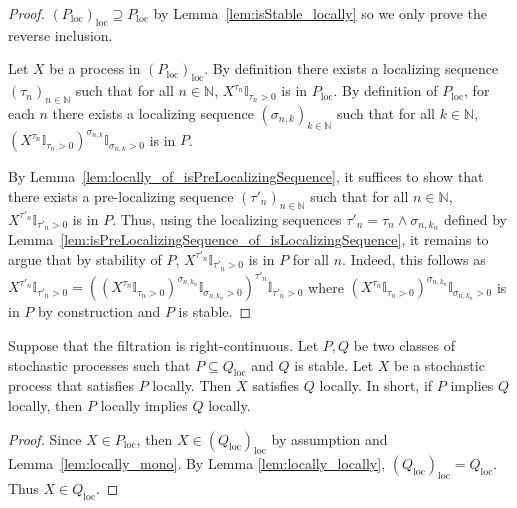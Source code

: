 \begin{proof}  
$(P_{\mathrm{loc}})_{\mathrm{loc}} \supseteq P_{\mathrm{loc}}$ by Lemma~\ref{lem:isStable_locally} so we only prove the reverse inclusion.

Let $X$ be a process in $(P_{\mathrm{loc}})_{\mathrm{loc}}$.
By definition there exists a localizing sequence $(\tau_n)_{n \in \mathbb{N}}$ such that for all $n \in \mathbb{N}$, $X^{\tau_n}\mathbb{I}_{\tau_n > 0}$ is in $P_{\mathrm{loc}}$.
By definition of $P_{\mathrm{loc}}$, for each $n$ there exists a localizing sequence $(\sigma_{n,k})_{k \in \mathbb{N}}$ such that for all $k \in \mathbb{N}$, $(X^{\tau_n}\mathbb{I}_{\tau_n > 0})^{\sigma_{n,k}}\mathbb{I}_{\sigma_{n,k} > 0}$ is in $P$.

By Lemma~\ref{lem:locally_of_isPreLocalizingSequence}, it suffices to show that there exists a pre-localizing sequence $(\tau'_n)_{n \in \mathbb{N}}$ such that for all $n \in \mathbb{N}$, $X^{\tau'_n}\mathbb{I}_{\tau'_n > 0}$ is in $P$.
Thus, using the localizing sequences $\tau'_n = \tau_n \wedge \sigma_{n, k_n}$ defined by Lemma~\ref{lem:isPreLocalizingSequence_of_isLocalizingSequence},
it remains to argue that by stability of $P$, $X^{\tau'_n}\mathbb{I}_{\tau'_n > 0}$ is in $P$ for all $n$.
Indeed, this follows as $X^{\tau'_n}\mathbb{I}_{\tau'_n > 0} = ((X^{\tau_n}\mathbb{I}_{\tau_n > 0})^{\sigma_{n,k_n}}\mathbb{I}_{\sigma_{n,k_n} > 0})^{\tau'_n}\mathbb{I}_{\tau'_n > 0}$ where $(X^{\tau_n}\mathbb{I}_{\tau_n > 0})^{\sigma_{n,k_n}}\mathbb{I}_{\sigma_{n,k_n} > 0}$ is in $P$ by construction and $P$ is stable.
\end{proof}


\begin{lemma}\label{lem:local_induction}
  \mathlibok
Suppose that the filtration is right-continuous.
Let $P, Q$ be two classes of stochastic processes such that $P \subseteq Q_{\mathrm{loc}}$ and $Q$ is stable.
Let $X$ be a stochastic process that satisfies $P$ locally.
Then $X$ satisfies $Q$ locally.
In short, if $P$ implies $Q$ locally, then $P$ locally implies $Q$ locally.
\end{lemma}

\begin{proof}  
Since $X \in P_{\mathrm{loc}}$, then $X \in (Q_{\mathrm{loc}})_{\mathrm{loc}}$ by assumption and Lemma~\ref{lem:locally_mono}.
By Lemma \ref{lem:locally_locally}, $(Q_{\mathrm{loc}})_{\mathrm{loc}} = Q_{\mathrm{loc}}$.
Thus $X \in Q_{\mathrm{loc}}$.
\end{proof}


